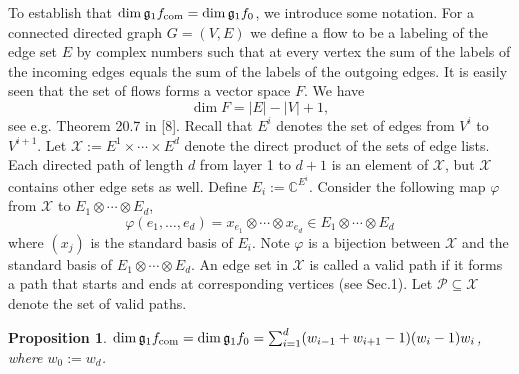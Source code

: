 \documentclass[10pt,a4paper]{article}
\newtheorem{proposition}[theorem]{Proposition}
\newcommand{\C}{\mathbb C}
\newcommand{\fcom}{f_{\rm com}}
\newcommand{\g}{\mathfrak g}
\begin{document}
To establish that $\dim\g_1\fcom=\dim\g_1f_0$, we introduce some notation.
For a connected directed graph $G=(V,E)$ we define a flow to be a labeling of the edge set $E$ by complex numbers such that at every vertex the sum of the labels of the incoming edges equals the sum of the labels of the outgoing edges. It is easily seen that the set of flows forms a vector space $F$. We have
\[\dim F=|E|-|V|+1,\tag{11}\label{eq:flowdim}\]
see e.g. Theorem 20.7 in [8].
Recall that $E^i$ denotes the set of edges from $V^i$ to $V^{i+1}$. Let $\mathcal X:=E^1\times\cdots\times E^d$ denote the direct product of the sets of edge lists. Each directed path of length $d$ from layer 1 to $d+1$ is an element of $\mathcal X$, but $\mathcal X$ contains other edge sets as well. Define $E_i:=\C^{E^i}$. Consider the following map $\varphi$ from $\mathcal X$ to $E_1\otimes\cdots\otimes E_d$,
\[\varphi(e_1,\ldots,e_d)=x_{e_1}\otimes\cdots\otimes x_{e_d}\in E_1\otimes\cdots\otimes E_d\]
where $(x_j)$ is the standard basis of $E_i$. Note $\varphi$ is a bijection between $\mathcal X$ and the standard basis of $E_1\otimes\cdots\otimes E_d$.
An edge set in $\mathcal X$ is called a valid path if it forms a path that starts and ends at corresponding vertices (see Sec.1). Let $\mathcal P\subseteq\mathcal X$ denote the set of valid paths.
\begin{proposition}
$\dim\g_1\fcom=\dim\g_1f_0=\sum_{i=1}^d(w_{i-1}+w_{i+1}-1)(w_i-1)w_i$, where $w_0:=w_d$.
\end{proposition}
\end{document}
